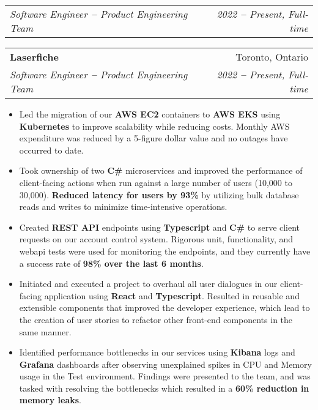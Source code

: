 \documentclass[letterpaper,10pt]{article}
\makeatletter
\newcommand{\resumeItem}[1]{
  \item\small{
    {#1 \vspace{-2pt}}
  }
}
\newcommand{\resumeSubheading}[4]{
  \vspace{-2pt}\item
    \ifthenelse{\equal{#1}{}}
    {
    \begin{tabular*}{0.97\textwidth}[t]{l@{\extracolsep{\fill}}r}
      \textit{\small#3} & \textit{\small #4} \\
    \end{tabular*}\vspace{-7pt}
    }
    {
    \begin{tabular*}{0.97\textwidth}[t]{l@{\extracolsep{\fill}}r}
      \textbf{#1} & #2 \\
      \textit{\small#3} & \textit{\small #4} \\
    \end{tabular*}\vspace{-7pt}
    }
}
\newcommand{\resumeItemListStart}{\begin{itemize}}
\newcommand{\resumeItemListEnd}{\end{itemize}\vspace{-5pt}}
\makeatother
\begin{document}
    \resumeSubheading
      {Laserfiche}{Toronto, Ontario}
      {Software Engineer \textbf{--} Product Engineering Team}{2022 \textbf{--} Present, Full-time}
        \resumeItemListStart
            \resumeItem{Led the migration of our \textbf{AWS EC2} containers to \textbf{AWS EKS} using \textbf{Kubernetes} to improve scalability while reducing costs. Monthly AWS expenditure was reduced by a 5-figure dollar value and no outages have occurred to date.}
            \resumeItem{Took ownership of two \textbf{C\#} microservices and improved the performance of client-facing actions when run against a large number of users (10,000 to 30,000). \textbf{Reduced latency for users by 93\%} by utilizing bulk database reads and writes to minimize time-intensive operations.}
            \resumeItem{Created \textbf{REST API} endpoints using \textbf{Typescript} and \textbf{C\#} to serve client requests on our account control system. Rigorous unit, functionality, and webapi tests were used for monitoring the endpoints, and they currently have a success rate of \textbf{98\% over the last 6 months}.}
            \resumeItem{Initiated and executed a project to overhaul all user dialogues in our client-facing application using \textbf{React} and \textbf{Typescript}. Resulted in reusable and extensible components that improved the developer experience, which lead to the creation of user stories to refactor other front-end components in the same manner.}
            \resumeItem{Identified performance bottlenecks in our services using \textbf{Kibana} logs and \textbf{Grafana} dashboards after observing unexplained spikes in CPU and Memory usage in the Test environment. Findings were presented to the team, and was tasked with resolving the bottlenecks which resulted in a \textbf{60\% reduction in memory leaks}.}
        \resumeItemListEnd
\end{document}
